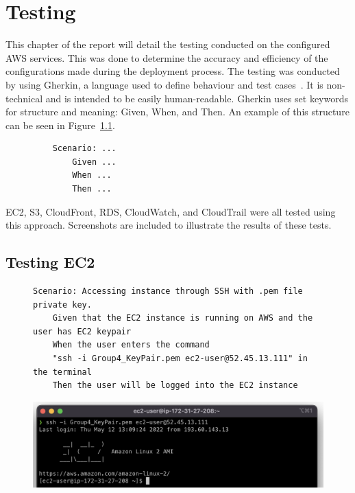 \chapter{Testing}\label{ch:testing}

This chapter of the report will detail the testing conducted on the configured AWS services.
This was done to determine the accuracy and efficiency of the configurations made during the deployment process.
The testing was conducted by using Gherkin, a language used to define behaviour and test
cases~\parencite{dos2018automated}.
It is non-technical and is intended to be easily human-readable.
Gherkin uses set keywords for structure and meaning: Given, When, and Then.
An example of this structure can be seen in Figure~\ref{fig:gherkin}.

\begin{figure}[!htbp]
    \centering
    \begin{verbatim}
    Scenario: ...
        Given ...
        When ...
        Then ...
    \end{verbatim}
    \label{fig:gherkin}
\end{figure}

EC2, S3, CloudFront, RDS, CloudWatch, and CloudTrail were all tested using this approach.
Screenshots are included to illustrate the results of these tests.

\section{Testing EC2}\label{sec:testing-ec2}

\begin{figure}[!htbp]
    \centering
    \begin{verbatim}
Scenario: Accessing instance through SSH with .pem file private key.
    Given that the EC2 instance is running on AWS and the user has EC2 keypair
    When the user enters the command
    "ssh -i Group4_KeyPair.pem ec2-user@52.45.13.111" in the terminal
    Then the user will be logged into the EC2 instance
    \end{verbatim}
    \label{fig:accessing-instance-ec2}
\end{figure}

\begin{figure}[!htbp]
    \centering
    \includegraphics[width=\textwidth]{resources/ec2/ec2-logged-in}
    \label{fig:ec2-test-logged-in}
\end{figure}

